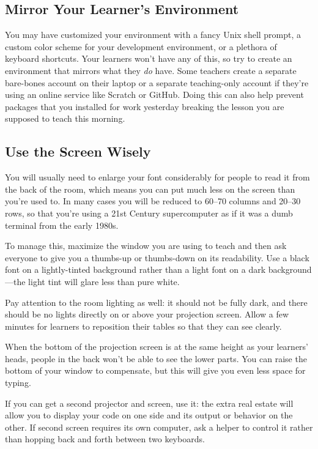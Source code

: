 \subsection*{Mirror Your Learner's Environment}

You may have customized your environment with a fancy Unix shell prompt,
a custom color scheme for your development environment,
or a plethora of keyboard shortcuts.
Your learners won't have any of this,
so try to create an environment that mirrors what they \emph{do} have.
Some teachers create a separate bare-bones account on their laptop
or a separate teaching-only account
if they're using an online service like Scratch or GitHub.
Doing this can also help prevent packages that you installed for work yesterday
breaking the lesson you are supposed to teach this morning.

\subsection*{Use the Screen Wisely}

You will usually need to enlarge your font considerably
for people to read it from the back of the room,
which means you can put much less on the screen than you're used to.
In many cases you will be reduced to 60--70 columns and 20--30 rows,
so that you're using a 21st Century supercomputer
as if it was a dumb terminal from the early 1980s.

To manage this,
maximize the window you are using to teach
and then ask everyone to give you a thumbs-up or thumbs-down on its readability.
Use a black font on a lightly-tinted background
rather than a light font on a dark background---the light tint will glare less
than pure white.

Pay attention to the room lighting as well:
it should not be fully dark, and there should be no lights directly
on or above your projection screen.
Allow a few minutes for learners to reposition their tables
so that they can see clearly.

When the bottom of the projection screen is at the same height as your learners' heads,
people in the back won't be able to see the lower parts.
You can raise the bottom of your window to compensate,
but this will give you even less space for typing.

If you can get a second projector and screen,
use it:
the extra real estate will allow you to display your code on one side
and its output or behavior on the other.
If second screen requires its own computer,
ask a helper to control it
rather than hopping back and forth between two keyboards.

